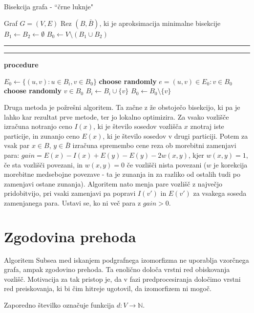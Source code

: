 \documentclass[a4paper, 12pt, ]{book}
\newcommand\Subalg[1]{%
	\Statex%
	\vspace*{-.7\baselineskip}%
	\hspace*{\dimexpr-\algorithmicindent-4pt\relax}%
	\rule{\textwidth}{0.4pt}%
	\Statex%
	
	\vspace*{-.7\baselineskip}%
	\Statex\hspace*{\dimexpr-\algorithmicindent-2pt\relax}%
	\rule{\textwidth}{0.4pt}%
	
	\Statex\hspace*{-\algorithmicindent}\textbf{procedure} #1%
}
\begin{document}
\begin{algorithm}
\caption{Bisekcija grafa - ``črne luknje"}
\label{alg:sub_bh}
\begin{algorithmic}[1]
	\Require Graf $G = (V, E)$
	\Ensure Rez $(B, \bar B)$, ki je aproksimacija minimalne bisekcije
	\State $B_1 \gets B_2 \gets \emptyset$
	\State $B_0 \gets V \setminus (B_1 \cup B_2)$
	\Repeat
		\State {}
		\State {}
	
	\Subalg{}

	 \Return \EndIf
	\State $E_0 \gets \{ (u,v): u \in B_i, v \in B_0 \}$
		\State \textbf{choose randomly} $e = (u,v) \in E_0: v \in B_0$
	\Else
		\State \textbf{choose randomly} $v \in B_0$
	\EndIf
	\State $B_i \gets B_i \cup \{ v \}$
	\State $B_0 \gets B_0 \setminus \{ v \}$
\end{algorithmic}
\end{algorithm}

	Druga metoda je požrešni algoritem. Ta začne z že obstoječo bisekcijo, ki pa je lahko kar rezultat prve metode, ter jo lokalno optimizira. Za vsako vozlišče
	izračuna notranjo ceno $I(x)$, ki je število sosedov vozlišča $x$ znotraj iste particije, in zunanjo ceno $E(x)$, ki je število sosedov v drugi particiji. Potem
	za vsak par $x \in B$, $y \in \bar B$ izračuna spremembo cene reza ob morebitni zamenjavi para: $gain = E(x) - I(x) + E(y)  - E(y) - 2w(x,y)$, kjer
	$w(x,y) = 1$, če sta vozlišči povezani, in $w(x,y) = 0$ če vozlišči nista povezani ($w$ je korekcija morebitne medsebojne povezave - ta je zunanja in za
	razliko od ostalih tudi po zamenjavi ostane zunanja). Algoritem nato menja pare vozlišč z največjo pridobitvijo, pri vsaki zamenjavi pa popravi $I(v')$ 
	in $E(v')$ za vsakega soseda zamenjanega para. Ustavi se, ko ni več para z $gain > 0$.
	
	
	
	\section{Zgodovina prehoda}
	\label{sub:th}
	Algoritem Subsea med iskanjem podgrafnega izomorfizma ne uporablja vzorčnega grafa, ampak zgodovino prehoda. Ta enolično določa vrstni red
	obiskovanja vozlišč. Motivacija za tak pristop je, da v fazi predprocesiranja določimo vrstni red preiskovanja, ki bi čim hitreje ugotovil, da izomorfizem
	ni mogoč.
	
	Zaporedno številko označuje funkcija $d : V \to \mathbb{N}$. 
	
\end{document}
